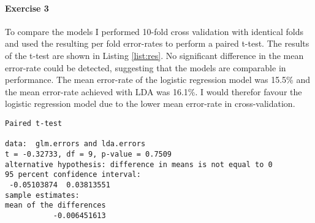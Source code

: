 \documentclass{paper}
\begin{document}
\paragraph{Exercise 3}

To compare the models I performed 10-fold cross validation with identical folds and used the resulting per fold error-rates to perform a paired t-test. The results of the t-test are shown in Listing \ref{list:res}. No significant difference in the mean error-rate could be detected, suggesting that the models are comparable in performance. The mean error-rate of the logistic regression model was 15.5\% and the mean error-rate achieved with LDA was 16.1\%. I would therefor favour the logistic regression model due to the lower mean error-rate in cross-validation.

\begin{minipage}{\linewidth}
  \begin{lstlisting}[caption={Summary of the logistic regression model.},
    label=list:res]
Paired t-test

data:  glm.errors and lda.errors
t = -0.32733, df = 9, p-value = 0.7509
alternative hypothesis: difference in means is not equal to 0
95 percent confidence interval:
 -0.05103874  0.03813551
sample estimates:
mean of the differences 
           -0.006451613 
  \end{lstlisting}
\end{minipage}
\end{document}
